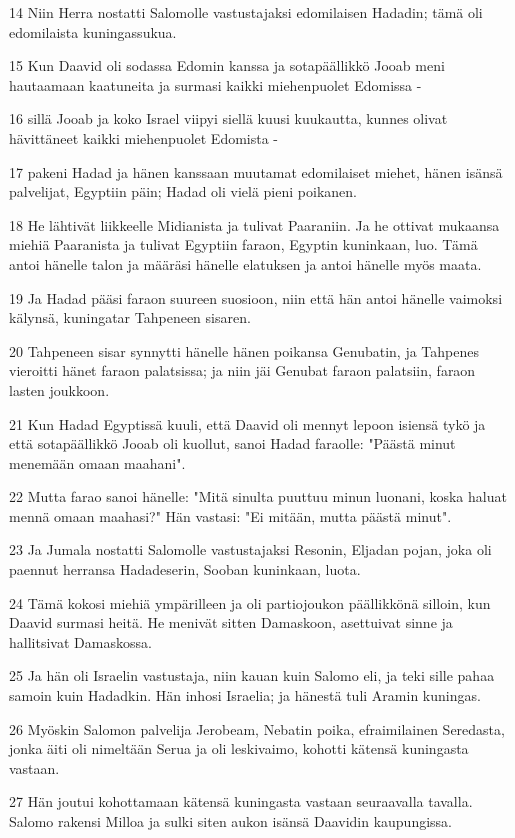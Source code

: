\par 14 Niin Herra nostatti Salomolle vastustajaksi edomilaisen Hadadin; tämä oli edomilaista kuningassukua.
\par 15 Kun Daavid oli sodassa Edomin kanssa ja sotapäällikkö Jooab meni hautaamaan kaatuneita ja surmasi kaikki miehenpuolet Edomissa -
\par 16 sillä Jooab ja koko Israel viipyi siellä kuusi kuukautta, kunnes olivat hävittäneet kaikki miehenpuolet Edomista -
\par 17 pakeni Hadad ja hänen kanssaan muutamat edomilaiset miehet, hänen isänsä palvelijat, Egyptiin päin; Hadad oli vielä pieni poikanen.
\par 18 He lähtivät liikkeelle Midianista ja tulivat Paaraniin. Ja he ottivat mukaansa miehiä Paaranista ja tulivat Egyptiin faraon, Egyptin kuninkaan, luo. Tämä antoi hänelle talon ja määräsi hänelle elatuksen ja antoi hänelle myös maata.
\par 19 Ja Hadad pääsi faraon suureen suosioon, niin että hän antoi hänelle vaimoksi kälynsä, kuningatar Tahpeneen sisaren.
\par 20 Tahpeneen sisar synnytti hänelle hänen poikansa Genubatin, ja Tahpenes vieroitti hänet faraon palatsissa; ja niin jäi Genubat faraon palatsiin, faraon lasten joukkoon.
\par 21 Kun Hadad Egyptissä kuuli, että Daavid oli mennyt lepoon isiensä tykö ja että sotapäällikkö Jooab oli kuollut, sanoi Hadad faraolle: "Päästä minut menemään omaan maahani".
\par 22 Mutta farao sanoi hänelle: "Mitä sinulta puuttuu minun luonani, koska haluat mennä omaan maahasi?" Hän vastasi: "Ei mitään, mutta päästä minut".
\par 23 Ja Jumala nostatti Salomolle vastustajaksi Resonin, Eljadan pojan, joka oli paennut herransa Hadadeserin, Sooban kuninkaan, luota.
\par 24 Tämä kokosi miehiä ympärilleen ja oli partiojoukon päällikkönä silloin, kun Daavid surmasi heitä. He menivät sitten Damaskoon, asettuivat sinne ja hallitsivat Damaskossa.
\par 25 Ja hän oli Israelin vastustaja, niin kauan kuin Salomo eli, ja teki sille pahaa samoin kuin Hadadkin. Hän inhosi Israelia; ja hänestä tuli Aramin kuningas.
\par 26 Myöskin Salomon palvelija Jerobeam, Nebatin poika, efraimilainen Seredasta, jonka äiti oli nimeltään Serua ja oli leskivaimo, kohotti kätensä kuningasta vastaan.
\par 27 Hän joutui kohottamaan kätensä kuningasta vastaan seuraavalla tavalla. Salomo rakensi Milloa ja sulki siten aukon isänsä Daavidin kaupungissa.
